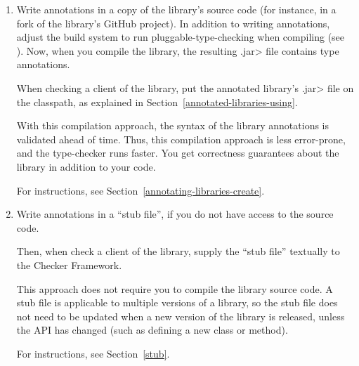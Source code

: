 \begin{enumerate}
\item
  Write annotations in a copy of the library's source code (for instance,
  in a fork of the library's GitHub project).  In addition to writing
  annotations, adjust the build system to run pluggable-type-checking when
  compiling (see ).  Now, when you compile
  the library, the resulting \<.jar> file contains type annotations.

  When checking a client of the library,
  put the annotated library's \<.jar> file on the classpath, as explained in
  Section~\ref{annotated-libraries-using}.


  With this compilation approach, the syntax of the library annotations is
  validated ahead of time.  Thus, this compilation approach is less
  error-prone, and the type-checker runs faster.  You get
  correctness guarantees about the library in addition to your code.

  For instructions, see Section~\ref{annotating-libraries-create}.

\item
  Write annotations in a ``stub file'', if you do not have access to the
  source code.

  Then, when check a client of the library,
  supply the ``stub file'' textually to the Checker Framework.

  This approach does not require you to compile the library source
  code.
  A stub file is applicable to multiple versions of a library, so
  the stub file does not need to be updated when a new version of the
  library is released, unless the API has changed (such as defining a new
  class or method).

  For instructions, see Section~\ref{stub}.

\end{enumerate}


